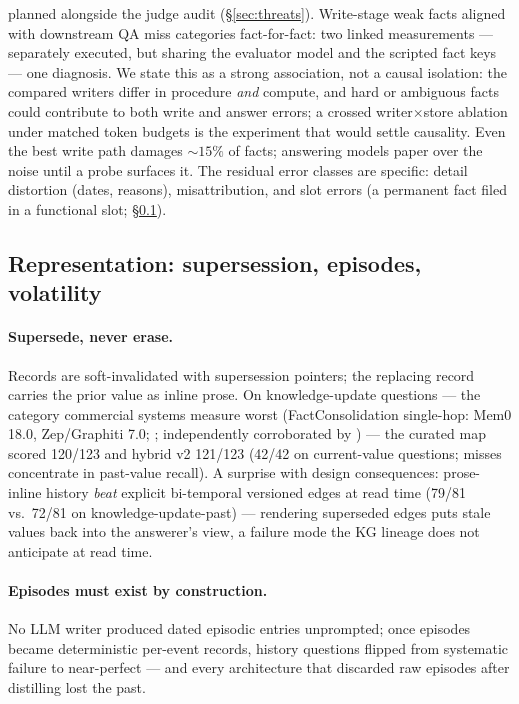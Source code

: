 planned alongside the judge audit (\S\ref{sec:threats}). Write-stage weak facts aligned with downstream
QA miss categories fact-for-fact: two linked measurements --- separately
executed, but sharing the evaluator model and the scripted fact keys ---
one diagnosis. We state this as a strong association, not a causal isolation:
the compared writers differ in procedure \emph{and} compute, and hard or
ambiguous facts could contribute to both write and answer errors; a crossed
writer$\times$store ablation under matched token budgets is the experiment
that would settle causality.
Even the best write path damages ${\sim}15\%$ of facts; answering models
paper over the noise until a probe surfaces it. The residual error classes
are specific: detail distortion (dates, reasons), misattribution, and slot
errors (a permanent fact filed in a functional slot;
\S\ref{sec:representation}).

\subsection{Representation: supersession, episodes, volatility}
\label{sec:representation}

\paragraph{Supersede, never erase.} Records are soft-invalidated with
supersession pointers; the replacing record carries the prior value as
inline prose. On knowledge-update questions --- the category commercial
systems measure worst (FactConsolidation single-hop: Mem0 18.0,
Zep/Graphiti 7.0; \citealp[v4, Table~3]{hu2026memoryagentbench};
independently corroborated by \citealp{reddy2026freshness}) --- the curated
map scored 120/123 and hybrid v2 121/123 (42/42 on current-value questions;
misses concentrate in past-value recall). A surprise with design
consequences: prose-inline history \emph{beat} explicit bi-temporal
versioned edges at read time (79/81 vs.\ 72/81 on knowledge-update-past)
--- rendering superseded edges puts stale values back into the answerer's
view, a failure mode the KG lineage \citep{rasmussen2025zep} does not
anticipate at read time.

\paragraph{Episodes must exist by construction.} No LLM writer produced
dated episodic entries unprompted; once episodes became deterministic
per-event records, history questions flipped from systematic failure to
near-perfect --- and every architecture that discarded raw episodes after
distilling lost the past.


